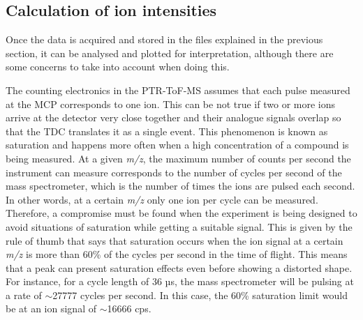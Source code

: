 



\subsection{Calculation of ion intensities}
Once the data is acquired and stored in the files explained in the previous section, it can be analysed and plotted for interpretation, although there are some concerns to %
take into account when doing this.

The counting electronics in the PTR-ToF-MS assumes that each pulse measured at the MCP corresponds to one ion. This can be not true if two or more ions arrive at the detector very close together and their analogue signals overlap so that the TDC translates it as a single event. This phenomenon is known as saturation and happens more often when a high concentration of a compound is being measured.
At a given \textit{m/z}, the maximum number of counts per second the instrument can measure corresponds to the number of cycles per second of the mass spectrometer, which is the number of times the ions are pulsed each second. In other words, at a certain \textit{m/z} only one ion per cycle can be measured. Therefore, a compromise must be found when the experiment is being designed to avoid situations of saturation while getting a suitable signal.
This is given by the rule of thumb that says that saturation occurs when the ion signal at a certain \textit{m/z} is more than 60\% of the cycles per second in the time of flight.
This means that a peak can present saturation effects even before showing a distorted shape. For instance, for a cycle length of 36 µs, the mass spectrometer will be pulsing at a rate of $\sim$27777 cycles per second.
In this case, the 60\% saturation limit would be at an ion signal of $\sim$16666 cps.

